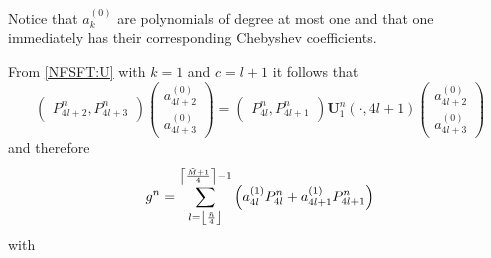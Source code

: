 Notice that $a_k^{(0)}$ are polynomials of 
degree at most one and that one immediately has their corresponding Chebyshev coefficients.

From \eqref{NFSFT:U} with $k = 1$ and $c = l+1$ it follows that
\[
\left(\begin{array}{c}
  P_{4l+2}^{n}, 
  P_{4l+3}^{n}
\end{array}\right)
\left(\begin{array}{c}
  a_{4l+2}^{(0)}\\
  a_{4l+3}^{(0)} 
\end{array}\right)
=
\left(\begin{array}{c}
  P_{4l}^{n},
  P_{4l+1}^{n}
\end{array}\right)
{\mathbf{U}_{1}^{n}\left(\cdot,4l+1\right)}
\left(\begin{array}{c}
  a_{4l+2}^{(0)}\\
  a_{4l+3}^{(0)} 
\end{array}\right)
\]
and therefore
\[ 
  g^n = \sum_{l = \left\lfloor\frac{\tilde{n}}{4}\right\rfloor}^{\left\lceil\frac{\tilde{M}+1}{4}\right\rceil-1} 
  \left(a_{4l}^{(1)} P_{4l}^{n} + a_{4l+1}^{(1)} P_{4l+1}^{n}\right) 
\]
with
